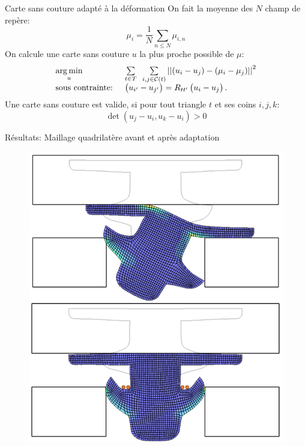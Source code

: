 \begin{frame}{Carte sans couture adapté à la déformation}
    On fait la moyenne des $N$ champ de repère: 
    $$ \mu_i = \frac{1}{N} \sum_{n \leq N} \mu_{i, n} $$
    \pause
    On calcule une carte sans couture $u$ la plus proche possible de $\mu$:
    \begin{equation*} \label{eq:quadcover_energy}
        \begin{array}{ll}
            \underset{u}{\argmin} & \underset{t \in T}{\sum}\ \ \underset{i, j \in \mathcal{C}(t)}{\sum}  \left|\left| (u_i - u_j) - (\mu_i - \mu_j)  \right|\right|^2\\
            \text{sous contrainte: } & \begin{pmatrix} u_{i'} - u_{j'} \end{pmatrix} = R_{tt'} \begin{pmatrix}  u_{i} - u_{j} \end{pmatrix}. \\
        \end{array}
    \end{equation*}
    \pause
    Une carte sans couture est valide, si pour tout triangle $t$ et ses coins $i, j, k$:
    \begin{equation*}\label{eq:positive_jacobien_2D}
        \det \left(u_{j} - u_{i}, u_{k} - u_{i} \right) > 0
    \end{equation*}
\end{frame}

\begin{frame}{Résultats: Maillage quadrilatère avant et après adaptation}
    \begin{figure}
        \centering
        \includegraphics[width=0.5\linewidth]{img/quadsimu/deformation_same_step.PNG}
    \end{figure}
\end{frame}
 
